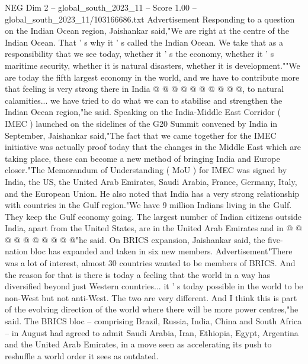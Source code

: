 \begin{textsample}{NEG Dim 2 – global\_south\_2023\_11 – Score 1.00 – global\_south\_2023\_11/103166686.txt}
Advertisement Responding to a question on the Indian Ocean region, Jaishankar said,"We are right at the centre of the Indian Ocean.
That ' s why it ' s called the Indian Ocean.
We take that as a responsibility that we see today, whether it ' s the economy, whether it ' s maritime security, whether it is natural disasters, whether it is development.""We are today the fifth largest economy in the world, and we have to contribute more that feeling is very strong there in India @ @ @ @ @ @ @ @ @ @, to natural calamities... we have tried to do what we can to stabilise and strengthen the Indian Ocean region,"he said.
Speaking on the India-Middle East Corridor ( IMEC ) launched on the sidelines of the G20 Summit convened by India in September, Jaishankar said,"The fact that we came together for the IMEC initiative was actually proof today that the changes in the Middle East which are taking place, these can become a new method of bringing India and Europe closer."The Memorandum of Understanding ( MoU ) for IMEC was signed by India, the US, the United Arab Emirates, Saudi Arabia, France, Germany, Italy, and the European Union.
He also noted that India has a very strong relationship with countries in the Gulf region."We have 9 million Indians living in the Gulf.
They keep the Gulf economy going.
The largest number of Indian citizens outside India, apart from the United States, are in the United Arab Emirates and in @ @ @ @ @ @ @ @ @ @"he said.
On BRICS expansion, Jaishankar said, the five-nation bloc has expanded and taken in six new members.
Advertisement"There was a lot of interest, almost 30 countries wanted to be members of BRICS.
And the reason for that is there is today a feeling that the world in a way has diversified beyond just Western countries... it ' s today possible in the world to be non-West but not anti-West.
The two are very different.
And I think this is part of the evolving direction of the world where there will be more power centres,"he said.
The BRICS bloc -- comprising Brazil, Russia, India, China and South Africa -- in August had agreed to admit Saudi Arabia, Iran, Ethiopia, Egypt, Argentina and the United Arab Emirates, in a move seen as accelerating its push to reshuffle a world order it sees as outdated.

\end{textsample}
